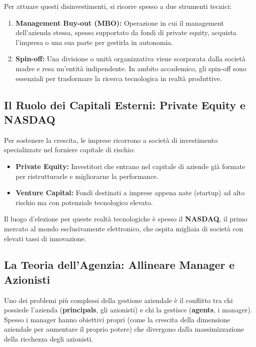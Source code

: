 \documentclass[a4paper,10pt]{article}
\begin{document}
Per attuare questi disinvestimenti, si ricorre spesso a due strumenti tecnici:
\begin{enumerate}
    \item \textbf{Management Buy-out (MBO):} Operazione in cui il management dell'azienda stessa, spesso supportato da fondi di private equity, acquista l'impresa o una sua parte per gestirla in autonomia.
    \item \textbf{Spin-off:} Una divisione o unità organizzativa viene scorporata dalla società madre e resa un'entità indipendente. In ambito accademico, gli spin-off sono essenziali per trasformare la ricerca tecnologica in realtà produttive.
\end{enumerate}

\subsection*{Il Ruolo dei Capitali Esterni: Private Equity e NASDAQ}

Per sostenere la crescita, le imprese ricorrono a società di investimento specializzate nel forniere capitale di rischio:
\begin{itemize}
    \item \textbf{Private Equity:} Investitori che entrano nel capitale di aziende già formate per ristrutturarle e migliorarne la performance.
    \item \textbf{Venture Capital:} Fondi destinati a imprese appena nate (startup) ad alto rischio ma con potenziale tecnologico elevato.
\end{itemize}

Il luogo d'elezione per queste realtà tecnologiche è spesso il \textbf{NASDAQ}, il primo mercato al mondo esclusivamente elettronico, che ospita migliaia di società con elevati tassi di innovazione.

\subsection*{La Teoria dell'Agenzia: Allineare Manager e Azionisti}

Uno dei problemi più complessi della gestione aziendale è il conflitto tra chi possiede l'azienda (\textbf{principals}, gli azionisti) e chi la gestisce (\textbf{agents}, i manager). Spesso i manager hanno obiettivi propri (come la crescita della dimensione aziendale per aumentare il proprio potere) che divergono dalla massimizzazione della ricchezza degli azionisti.
\end{document}
